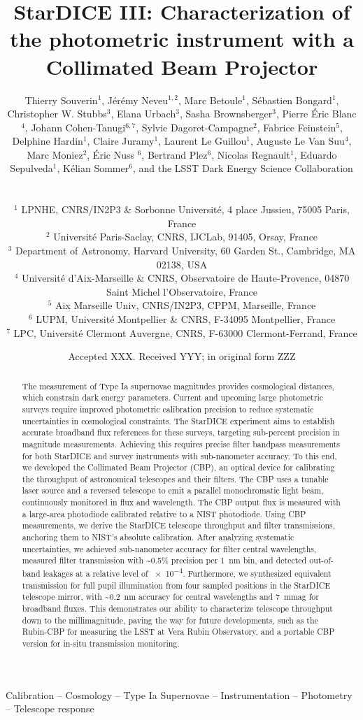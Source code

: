 \documentclass[fleqn,usenatbib]{rasti}
\title{StarDICE III: Characterization of the photometric instrument with a Collimated Beam Projector}
\author[T.~Souverin et al.]
{\parbox{\textwidth}{
Thierry Souverin$^{1}$,
Jérémy Neveu$^{1,2}$,
Marc Betoule$^{1}$,
Sébastien Bongard$^{1}$,
Christopher W. Stubbs$^{3}$,
Elana Urbach$^{3}$,
Sasha Brownsberger$^{3}$,
Pierre Éric Blanc$^{4}$,
Johann Cohen-Tanugi$^{6,7}$,
Sylvie Dagoret-Campagne$^{2}$,
Fabrice Feinstein$^{5}$,
Delphine Hardin$^{1}$,
Claire Juramy$^{1}$,
Laurent Le Guillou$^{1}$,
Auguste Le Van Suu$^{4}$,
Marc Moniez$^{2}$,
Éric Nuss \textsuperscript{\textdagger}$^{6}$,
Bertrand Plez$^{6}$,
Nicolas Regnault$^{1}$,
Eduardo Sepulveda$^{1}$,
Kélian Sommer$^{6}$,
and the LSST Dark Energy Science Collaboration$^{}$}
  \vspace{0.4cm}
  \\
\parbox{\textwidth}{
$^1$ LPNHE, CNRS/IN2P3 \& Sorbonne Université, 4 place Jussieu, 75005 Paris, France\\
$^2$ Universit\'e Paris-Saclay, CNRS, IJCLab, 91405, Orsay, France\\
$^3$ Department of Astronomy, Harvard University, 60 Garden St., Cambridge, MA 02138, USA\\
$^4$ Université d’Aix-Marseille \& CNRS, Observatoire de Haute-Provence, 04870 Saint Michel l’Observatoire, France\\
$^5$ Aix Marseille Univ, CNRS/IN2P3, CPPM, Marseille, France\\
$^6$ LUPM, Université Montpellier \& CNRS, F-34095 Montpellier, France\\
$^7$ LPC, Université Clermont Auvergne, CNRS, F-63000 Clermont-Ferrand, France}
}
\date{Accepted XXX. Received YYY; in original form ZZZ}
\begin{document}
\label{firstpage}
\pagerange{\pageref{firstpage}--\pageref{lastpage}}
\maketitle

\begin{abstract}
The measurement of Type Ia supernovae magnitudes provides cosmological distances, which constrain dark energy parameters. Current and upcoming large photometric surveys require improved photometric calibration precision to reduce systematic uncertainties in cosmological constraints. The StarDICE experiment aims to establish accurate broadband flux references for these surveys, targeting sub-percent precision in magnitude measurements. Achieving this requires precise filter bandpass measurements for both StarDICE and survey instruments with sub-nanometer accuracy. To this end,  we developed the Collimated Beam Projector (CBP), an optical device for calibrating the throughput of astronomical telescopes and their filters. The CBP uses a tunable laser source and a reversed telescope to emit a parallel monochromatic light beam, continuously monitored in flux and wavelength. The CBP output flux is measured with a large-area photodiode calibrated relative to a NIST photodiode. Using CBP measurements, we derive the StarDICE telescope throughput and filter transmissions, anchoring them to NIST’s absolute calibration. After analyzing systematic uncertainties, we achieved sub-nanometer accuracy for filter central wavelengths, measured filter transmission with \textasciitilde 0.5\%  precision per \SI{1}{nm} bin, and detected out-of-band leakages at a relative level of \num{e-4}. Furthermore, we synthesized equivalent transmission for full pupil illumination from four sampled positions in the StarDICE telescope mirror, with \textasciitilde \SI{0.2}{nm} accuracy for central wavelengths and \SI{7}{mmag} for broadband fluxes. This demonstrates our ability to characterize telescope throughput down to the millimagnitude, paving the way for future developments, such as the Rubin-CBP for measuring the LSST at Vera Rubin Observatory, and a portable CBP version for in-situ transmission monitoring.
\end{abstract}

\begin{keywords}
Calibration -- Cosmology -- Type Ia Supernovae -- Instrumentation -- Photometry -- Telescope response
\end{keywords}
\end{document}
